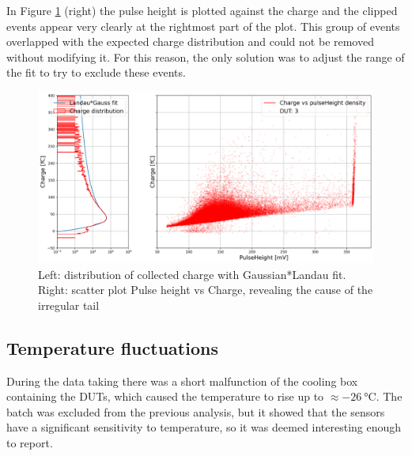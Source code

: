 In Figure \ref{fig:charge_vs_pulseHeight_for_clipping} (right) the pulse height is plotted against the charge and the clipped events appear very clearly at the rightmost part of the plot. This group of events overlapped with the expected charge distribution and could not be removed without modifying it. For this reason, the only solution was to adjust the range of the fit to try to exclude these events.

\begin{figure}[h!tbp]
    \centering
    \includegraphics[width=1\linewidth]{Images/charge_plots/Charge_vs_pulseHeight_density_413_S2_dut3.png}
    \captionsetup{width=\captionwidth}
    \caption{Left: distribution of collected charge with Gaussian*Landau fit. Right: scatter plot Pulse height vs Charge, revealing the cause of the irregular tail}
    \label{fig:charge_vs_pulseHeight_for_clipping}
\end{figure}

\FloatBarrier

\subsection{Temperature fluctuations}\label{sec:temperature_fluctuations}

During the data taking there was a short malfunction of the cooling box containing the DUTs, which caused the temperature to rise up to \(\approx\qty{-26}{\degreeCelsius}\). The batch was excluded from the previous analysis, but it showed that the sensors have a significant sensitivity to temperature, so it was deemed interesting enough to report.

